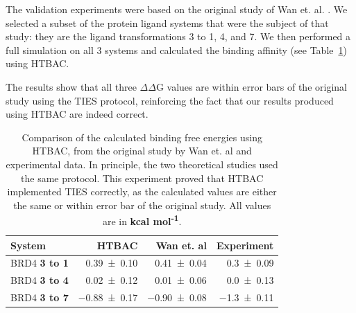 The validation experiments were based on the original study of Wan et. al.
\cite{Wan2017brd4}. We selected a subset of the protein ligand systems that
were the subject of that study: they are the ligand transformations 3 to 1,
4, and 7. We then performed a full simulation on all 3 systems and calculated
the binding affinity (see Table~\ref{tab:exp2}) using HTBAC.

The results show that all three $\Delta \Delta$G values are within error bars
of the original study using the TIES protocol, reinforcing the fact that our
results produced using HTBAC are indeed correct.

\begin{table}
  \centering
  \caption{Comparison of the calculated binding free energies using HTBAC,
  from the original study by Wan et. al and experimental data. In principle,
  the two theoretical studies used the same protocol. This experiment proved
  that HTBAC implemented TIES correctly, as the calculated values are either
  the same or within error bar of the original study. All values are in
  \textbf{kcal mol\textsuperscript{-1}}.}  %
  \begin{tabular}{lrrr}
    \toprule
    System & HTBAC & Wan et. al & Experiment \\
    \midrule
    BRD4 \textbf{3 to 1} & \num{0.39 +- 0.10} &   \num{0.41 +- 0.04} &  \num{0.3 +- 0.09} \\
    BRD4 \textbf{3 to 4} & \num{0.02 +- 0.12} &   \num{0.01 +- 0.06} &  \num{0.0 +- 0.13} \\
    BRD4 \textbf{3 to 7} & \num{-0.88 +- 0.17} &  \num{-0.90 +- 0.08} & \num{-1.3 +- 0.11} \\
    \bottomrule
  \end{tabular}
  \label{tab:exp2}
\end{table}



